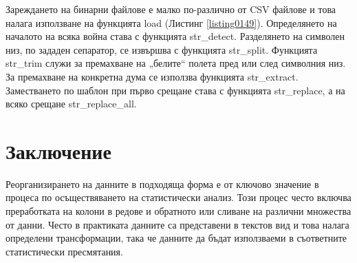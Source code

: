 Зареждането на бинарни файлове е малко по-различно от CSV файлове и това налага използване на функцията load (Листинг \ref{listing0149}). Определянето на началото на всяка война става с функцията str\_detect. Разделянето на символен низ, по зададен сепаратор, се извършва с функцията str\_split.  Функцията str\_trim служи за премахване на „белите“ полета пред или след символния низ. За премахване на конкретна дума се използва функцията str\_extract. Заместването по шаблон при първо срещане става с функцията str\_replace, а на всяко срещане str\_replace\_all. 

\section*{Заключение}

Реорганизирането на данните в подходяща форма е от ключово значение в процеса по осъществяването на статистически анализ. Този процес често включва преработката на колони в редове и обратното или сливане на различни множества от данни. Често в практиката данните са представени в текстов вид и това налага определени трансформации, така че данните да бъдат използваеми в съответните статистически пресмятания. 

